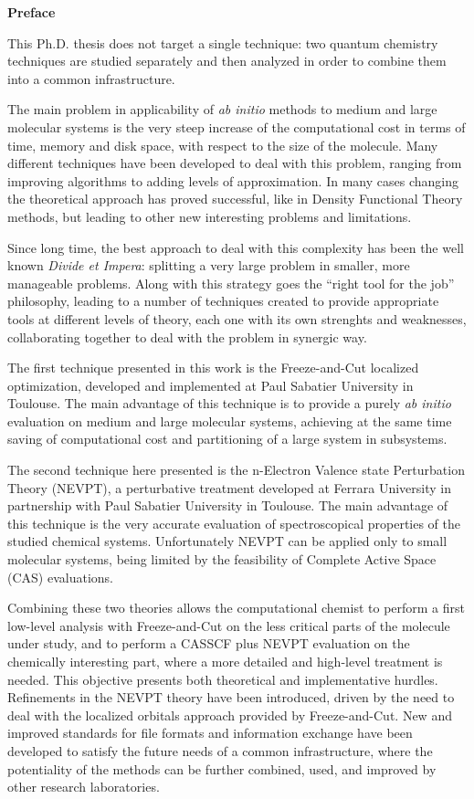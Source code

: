 {\Huge \textbf{Preface}}
\vspace{6mm}


This Ph.D. thesis does not target a single technique: two quantum chemistry
techniques are studied separately and then analyzed in order to combine them
into a common infrastructure.

The main problem in applicability of \textit{ab initio} methods to medium
and large molecular systems is the very steep increase of the computational
cost in terms of time, memory and disk space, with respect to the size of
the molecule. Many different techniques have been developed to deal with
this problem, ranging from improving algorithms to adding levels of
approximation. In many cases changing the theoretical approach has
proved successful, like in Density Functional Theory methods, but
leading to other new interesting problems and limitations.

Since long time, the best approach to deal with this complexity has been 
the well known \textit{Divide et Impera}: splitting a very large problem in smaller,
more manageable problems. Along with this strategy goes the ``right tool for
the job'' philosophy, leading to a number of techniques created to provide
appropriate tools at different levels of theory, each one with its own
strenghts and weaknesses, collaborating together to deal with the problem in
synergic way.

The first technique presented in this work is the Freeze-and-Cut
localized optimization, developed and implemented at Paul Sabatier
University in Toulouse. The main advantage of this technique is to
provide a purely \textit{ab initio} evaluation on medium and large molecular
systems, achieving at the same time saving of computational cost and
partitioning of a large system in subsystems.

The second technique here presented is the n-Electron Valence state
Perturbation Theory (NEVPT), a perturbative treatment developed at Ferrara
University in partnership with Paul Sabatier University in Toulouse. The main advantage of this
technique is the very accurate evaluation of spectroscopical properties of
the studied chemical systems. Unfortunately NEVPT can be applied only to
small molecular systems, being limited by the feasibility of Complete Active
Space (CAS) evaluations.

Combining these two theories allows the computational chemist to perform a
first low-level analysis with Freeze-and-Cut on the less critical parts of
the molecule under study, and to perform a CASSCF plus NEVPT evaluation on the chemically interesting
part, where a more detailed and high-level treatment is needed.  This
objective presents both theoretical and implementative hurdles.  Refinements
in the NEVPT theory have been introduced, driven by the need to deal with
the localized orbitals approach provided by Freeze-and-Cut. New and
improved standards for file formats and information exchange have been
developed to satisfy the future needs of a common infrastructure, where the
potentiality of the methods can be further combined, used, and improved by
other research laboratories.

